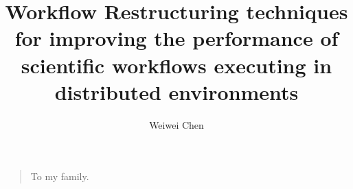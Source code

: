  



\title{Workflow Restructuring techniques for improving the performance of scientific workflows executing in distributed environments}
\author{Weiwei Chen}
\maketitle

  \begin{quote}
  To my family.
  \end{quote}



\newpage
\tableofcontents
\newpage
\listoftables
\newpage
\listoffigures


  

\mainmatter

%
















